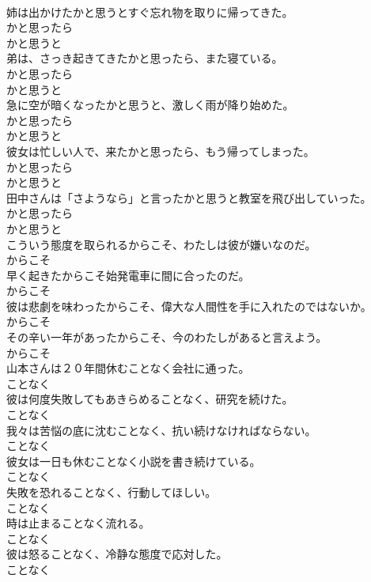 \documentclass[8pt]{extreport}
\begin{document}
\begin{CJK}{UTF8}{min}
\\	姉は出かけたかと思うとすぐ忘れ物を取りに帰ってきた。	
\\	かと思ったら 
\\	かと思うと
\\	弟は、さっき起きてきたかと思ったら、また寝ている。	
\\	かと思ったら 
\\	かと思うと
\\	急に空が暗くなったかと思うと、激しく雨が降り始めた。	
\\	かと思ったら 
\\	かと思うと
\\	彼女は忙しい人で、来たかと思ったら、もう帰ってしまった。	
\\	かと思ったら 
\\	かと思うと
\\	田中さんは「さようなら」と言ったかと思うと教室を飛び出していった。	
\\	かと思ったら 
\\	かと思うと
\\	こういう態度を取られるからこそ、わたしは彼が嫌いなのだ。	
\\	からこそ
\\	早く起きたからこそ始発電車に間に合ったのだ。	
\\	からこそ
\\	彼は悲劇を味わったからこそ、偉大な人間性を手に入れたのではないか。	
\\	からこそ
\\	その辛い一年があったからこそ、今のわたしがあると言えよう。	
\\	からこそ
\\	山本さんは２０年間休むことなく会社に通った。	
\\	ことなく
\\	彼は何度失敗してもあきらめることなく、研究を続けた。	
\\	ことなく
\\	我々は苦悩の底に沈むことなく、抗い続けなければならない。	
\\	ことなく
\\	彼女は一日も休むことなく小説を書き続けている。	
\\	ことなく
\\	失敗を恐れることなく、行動してほしい。	
\\	ことなく
\\	時は止まることなく流れる。	
\\	ことなく
\\	彼は怒ることなく、冷静な態度で応対した。	
\\	ことなく

\end{CJK}
\end{document}
